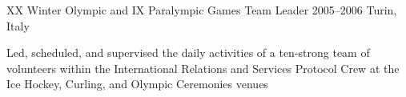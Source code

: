 \begin{cventries}
\cventry
    {XX Winter Olympic and IX Paralympic Games} %
    {Team Leader} %
    {2005--2006} %
    {Turin, Italy} %
    {
      \begin{cvitems} %
        \item {Led, scheduled, and supervised the daily activities of a ten-strong team of volunteers within the International Relations and Services Protocol Crew at the Ice Hockey, Curling, and Olympic Ceremonies venues}
      \end{cvitems}
    }

\end{cventries}
